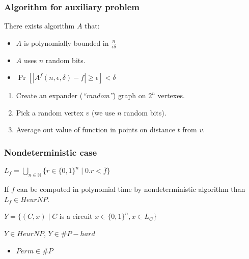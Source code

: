 \begin{frame}
    \frametitle{Algorithm for auxiliary problem}

    \begin{statement}
        There exists algorithm $A$ that:
        \begin{itemize}
	        \item $A$ is polynomially bounded in $\frac{n}{\epsilon\delta}$
        	\item $A$ uses $n$ random bits.
        	\item $\Pr[|A^{f}(n, \epsilon, \delta) - \overline{f}| \ge \epsilon] <
		        \delta$
        \end{itemize}
    \end{statement}

    \begin{enumerate}
 		\item Create an expander ({\it ``random''}) graph on $2^n$ vertexes.
    	\item Pick a random vertex $v$ (we use $n$ random bits).
    	\item Average out value of function in points on distance $t$ from $v$.
    \end{enumerate}
    
\end{frame}

\begin{frame}
    \frametitle{Nondeterministic case}

    $L_f = \bigcup\limits_{n \in \mathbb{N}}\{r \in \{0, 1\}^n \mid 0.r <
    \overline{f}\}$

    \begin{lemma}
        If $f$ can be computed in polynomial time by nondeterministic algorithm than
        $L_f \in HeurNP$.
    \end{lemma}
    
	$Y = \{(C, x) \mid C$ is a circuit $x \in \{0, 1\}^n, x \in L_{C}\}$
    
    \begin{lemma}
        $Y \in HeurNP$, $Y \in \#P-hard$
    \end{lemma}

    \begin{itemize}
	    \item $Perm \in \#P$
    \end{itemize}
    
\end{frame}